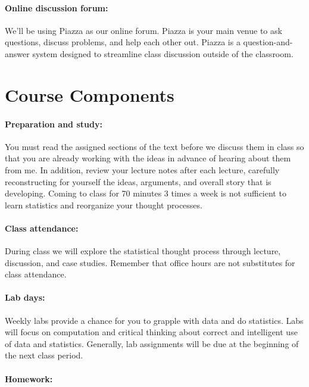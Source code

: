 \documentclass[11pt,]{article}
\begin{document}
\paragraph{Online discussion forum:}\label{online-discussion-forum}

We'll be using Piazza as our online forum. Piazza is your main venue to
ask questions, discuss problems, and help each other out. Piazza is a
question-and-answer system designed to streamline class discussion
outside of the classroom.

\section{Course Components}\label{course-components}

\paragraph{Preparation and study:}\label{preparation-and-study}

You must read the assigned sections of the text before we discuss them
in class so that you are already working with the ideas in advance of
hearing about them from me. In addition, review your lecture notes after
each lecture, carefully reconstructing for yourself the ideas,
arguments, and overall story that is developing. Coming to class for 70
minutes 3 times a week is not sufficient to learn statistics and
reorganize your thought processes.

\paragraph{Class attendance:}\label{class-attendance}

During class we will explore the statistical thought process through
lecture, discussion, and case studies. Remember that office hours are
not substitutes for class attendance.

\paragraph{Lab days:}\label{lab-days}

Weekly labs provide a chance for you to grapple with data and do
statistics. Labs will focus on computation and critical thinking about
correct and intelligent use of data and statistics. Generally, lab
assignments will be due at the beginning of the next class period.

\paragraph{Homework:}\label{homework}
\end{document}
